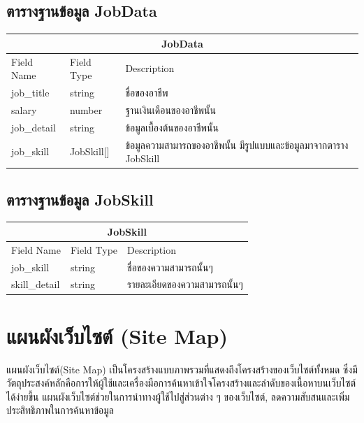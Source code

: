 \subsection{ตารางฐานข้อมูล JobData}
\begin{table}[H]
  \begin{tabular*}{\textwidth}{l|l|p{}}
  \hline
    \multicolumn{3}{c}{JobData}                                                                      \\\hline
    Field Name  & Field Type     & Description                                                       \\\hline
    job\_title  & string         & ชื่อของอาชีพ                                                      \\
    salary      & number         & ฐานเงินเดือนของอาชีพนั้น                                          \\
    job\_detail & string         & ข้อมูลเบื้องต้นของอาชีพนั้น                                       \\
    job\_skill  & JobSkill{[}{]} & ข้อมูลความสามารถของอาชีพนั้น มีรูปแบบและข้อมูลมาจากตาราง JobSkill \\ \hline
  \end{tabular*}
\end{table}

\subsection{ตารางฐานข้อมูล JobSkill}
\begin{table}[H]
  \begin{tabular*}{\textwidth}{l|l|p{}}
  \hline
    \multicolumn{3}{c}{JobSkill}                              \\\hline
    Field Name    & Field Type & Description                  \\\hline
    job\_skill    & string     & ชื่อของความสามารถนั้นๆ       \\
    skill\_detail & string     & รายละเอียดของความสามารถนั้นๆ \\\hline
  \end{tabular*}
\end{table}


\section{แผนผังเว็บไซต์ (Site Map)}
แผนผังเว็บไซต์(Site Map) เป็นโครงสร้างแบบภาพรวมที่แสดงถึงโครงสร้างของเว็บไซต์ทั้งหมด ซึ่งมีวัตถุประสงค์หลักคือการให้ผู้ใช้และเครื่องมือการค้นหาเข้าใจโครงสร้างและลำดับของเนื้อหาบนเว็บไซต์ได้ง่ายขึ้น แผนผังเว็บไซต์ช่วยในการนำทางผู้ใช้ไปสู่ส่วนต่าง ๆ ของเว็บไซต์, ลดความสับสนและเพิ่มประสิทธิภาพในการค้นหาข้อมูล

